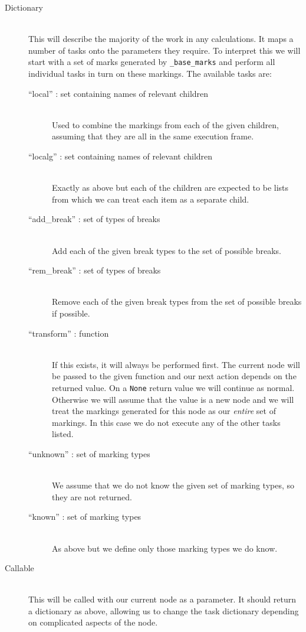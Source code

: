 \documentclass[twoside,a4paper]{report}
\begin{document}
\begin{description}
\item[Dictionary] \hfill \\
This will describe the majority of the work in any calculations. It maps a number of tasks onto the parameters they require. To interpret this we will
start with a set of marks generated by \texttt{\_base\_marks} and perform all individual tasks in turn on these markings. The available tasks are:

\begin{description}
\item[``local'' : set containing names of relevant children] \hfill \\
Used to combine the markings from each of the given children, assuming that they are all in the same execution frame.
\item[``localg'' : set containing names of relevant children] \hfill \\
Exactly as above but each of the children are expected to be lists from which we can treat each item as a separate child.
\item[``add\_break'' : set of types of breaks] \hfill \\
Add each of the given break types to the set of possible breaks.
\item[``rem\_break'' : set of types of breaks] \hfill \\
Remove each of the given break types from the set of possible breaks if possible.
\item[``transform'' : function] \hfill \\
If this exists, it will always be performed first. The current node will be passed to the given function and our next action depends on the returned value. On a
\texttt{None} return value we will continue as normal. Otherwise we will assume that the value is a new node and we will treat the markings generated for this node as our
\textit{entire} set of markings. In this case we do not execute any of the other tasks listed.
\item[``unknown'' : set of marking types] \hfill \\
We assume that we do not know the given set of marking types, so they are not returned.
\item[``known'' : set of marking types] \hfill \\
As above but we define only those marking types we do know.
\end{description}

\item[Callable] \hfill \\
This will be called with our current node as a parameter. It should return a dictionary as above, allowing us to change the task dictionary depending on
complicated aspects of the node.


\end{description}
\end{document}
